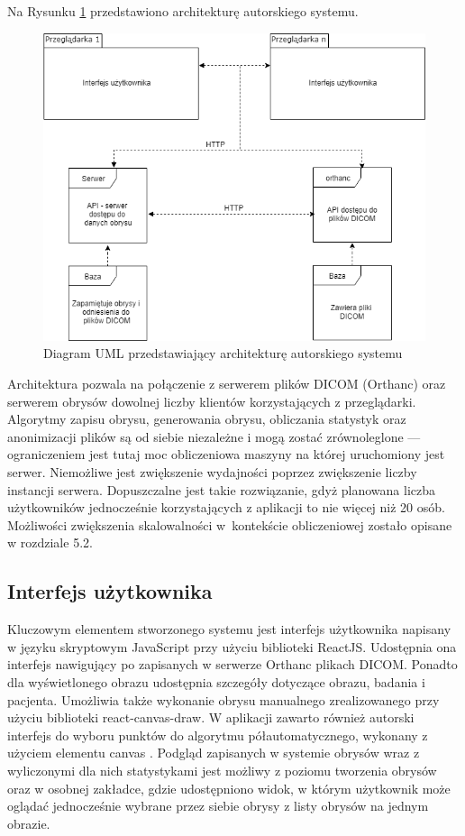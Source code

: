 \documentclass[a4paper,11pt,twoside,openright]{report}
\theoremstyle{definition}
\begin{document}
Na Rysunku \ref{fig:architektura} przedstawiono architekturę autorskiego systemu.

\begin{figure}[h]
	\center
	\includegraphics[width=1\textwidth]{architektura}
	\caption{Diagram UML przedstawiający architekturę autorskiego systemu}
    	\label{fig:architektura}
\end{figure}

Architektura pozwala na połączenie z serwerem plików DICOM (Orthanc) oraz serwerem
obrysów dowolnej liczby klientów korzystających z przeglądarki. Algorytmy zapisu
obrysu, generowania obrysu, obliczania statystyk oraz anonimizacji plików są od
siebie niezależne i mogą zostać zrównoleglone --- ograniczeniem jest tutaj moc
obliczeniowa maszyny na której uruchomiony jest serwer. Niemożliwe jest zwiększenie
wydajności poprzez zwiększenie liczby instancji serwera. Dopuszczalne jest takie
rozwiązanie, gdyż planowana liczba użytkowników jednocześnie korzystających z aplikacji
to nie więcej niż 20 osób. Możliwości zwiększenia skalowalności w~kontekście
obliczeniowej zostało opisane w rozdziale 5.2.

\subsection {Interfejs użytkownika}

Kluczowym elementem stworzonego systemu jest interfejs użytkownika napisany w
języku skryptowym JavaScript przy użyciu biblioteki ReactJS. Udostępnia ona
interfejs nawigujący po zapisanych w serwerze Orthanc plikach DICOM. Ponadto dla
wyświetlonego obrazu udostępnia szczegóły dotyczące obrazu, badania i pacjenta.
Umożliwia także wykonanie obrysu manualnego zrealizowanego przy użyciu biblioteki
react-canvas-draw. W aplikacji zawarto również autorski interfejs do wyboru punktów
do algorytmu półautomatycznego, wykonany z użyciem elementu canvas \cite{Canvas}.
Podgląd zapisanych w systemie obrysów wraz z wyliczonymi dla nich statystykami
jest możliwy z poziomu tworzenia obrysów oraz w osobnej zakładce, gdzie udostępniono
widok, w którym użytkownik może oglądać jednocześnie wybrane przez siebie obrysy
z listy obrysów na jednym obrazie.
\end{document}

